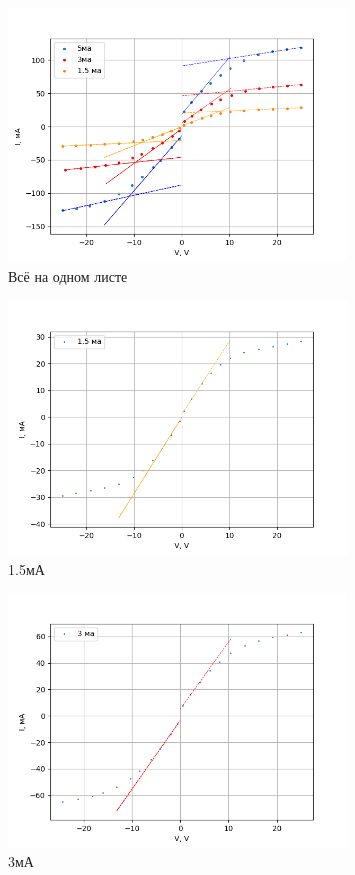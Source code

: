 \documentclass[12pt,a4paper]{article}
\begin{document}
\begin{figure}[H]
  \centering
  \includegraphics*[width=0.8\textwidth]{p2.png}
  \caption{Всё на одном листе}
\end{figure}
\begin{figure}[H]
  \centering
  \includegraphics*[width=0.8\textwidth]{отдельный график 1.5мА.png}
  \caption{1.5мА}
\end{figure}
\begin{figure}[H]
  \centering
  \includegraphics*[width=0.8\textwidth]{отдельный график 3мА.png}
  \caption{3мА}
\end{figure}
\end{document}
